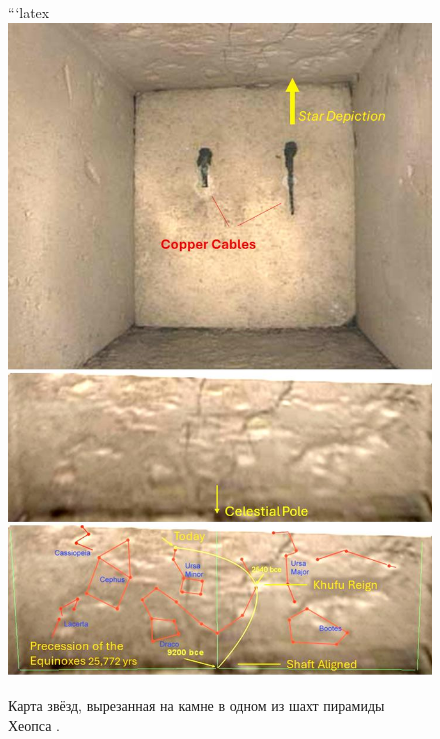 \documentclass[10pt,twocolumn,letterpaper]{article}
\begin{document}
\begin{figure}[H]
\begin{center}
```latex
   \includegraphics[width=1\linewidth]{star-stone.jpg}
\end{center}
   \caption{Карта звёзд, вырезанная на камне в одном из шахт пирамиды Хеопса \cite{28}.}
\label{fig:20}
\label{fig:onecol}
\end{figure}
\end{document}
